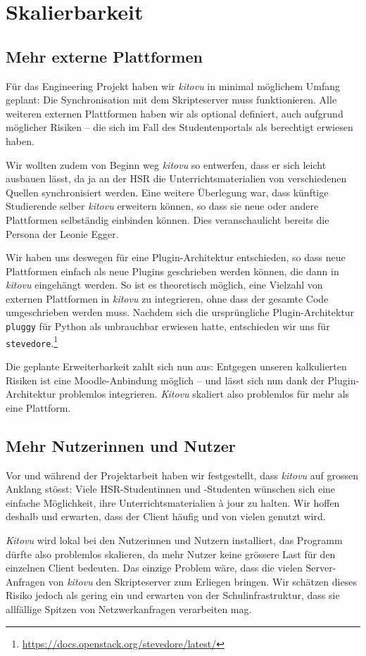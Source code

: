 \documentclass[a4paper]{article}
\let\oldsection\section
\renewcommand\section{\clearpage\oldsection}
\begin{document}
\section{Skalierbarkeit}

\subsection{Mehr externe Plattformen}

Für das Engineering Projekt haben wir \emph{kitovu} in minimal möglichem Umfang geplant: Die Synchronisation mit dem Skripteserver muss funktionieren. Alle weiteren externen Plattformen haben wir als optional definiert, auch aufgrund möglicher Risiken -- die sich im Fall des Studentenportals als berechtigt erwiesen haben.

Wir wollten zudem von Beginn weg \emph{kitovu} so entwerfen, dass er sich leicht ausbauen lässt, da ja an der HSR die Unterrichtsmaterialien von verschiedenen Quellen synchronisiert werden. Eine weitere Überlegung war, dass künftige Studierende selber \emph{kitovu} erweitern können, so dass sie neue oder andere Plattformen selbständig einbinden können. Dies veranschaulicht bereits die Persona der Leonie Egger. 

Wir haben uns deswegen für eine Plugin-Architektur entschieden, so dass neue Plattformen einfach als neue Plugins geschrieben werden können, die dann in \emph{kitovu} eingehängt werden. So ist es theoretisch möglich, eine Vielzahl von externen Plattformen in \emph{kitovu} zu integrieren, ohne dass der gesamte Code umgeschrieben werden muss. Nachdem sich die ursprüngliche Plugin-Architektur \verb|pluggy| für Python als unbrauchbar erwiesen hatte, entschieden wir uns für \verb|stevedore|.\footnote{\url{https://docs.openstack.org/stevedore/latest/}}

Die geplante Erweiterbarkeit zahlt sich nun aus: Entgegen unseren kalkulierten Risiken ist eine Moodle-Anbindung möglich -- und lässt sich nun dank der Plugin-Architektur problemlos integrieren. \emph{Kitovu} skaliert also problemlos für mehr als eine Plattform.

\subsection{Mehr Nutzerinnen und Nutzer}

Vor und während der Projektarbeit haben wir festgestellt, dass \emph{kitovu} auf grossen Anklang stösst: Viele HSR-Studentinnen und -Studenten wünschen sich eine einfache Möglichkeit, ihre Unterrichtsmaterialien à jour zu halten. Wir hoffen deshalb und erwarten, dass der Client häufig und von vielen genutzt wird.

\emph{Kitovu} wird lokal bei den Nutzerinnen und Nutzern installiert, das Programm dürfte also problemlos skalieren, da mehr Nutzer keine grössere Last für den einzelnen Client bedeuten. Das einzige Problem wäre, dass die vielen Server-Anfragen von \emph{kitovu} den Skripteserver zum Erliegen bringen. Wir schätzen dieses Risiko jedoch als gering ein und erwarten von der Schulinfrastruktur, dass sie allfällige Spitzen von Netzwerkanfragen verarbeiten mag.
\end{document}
